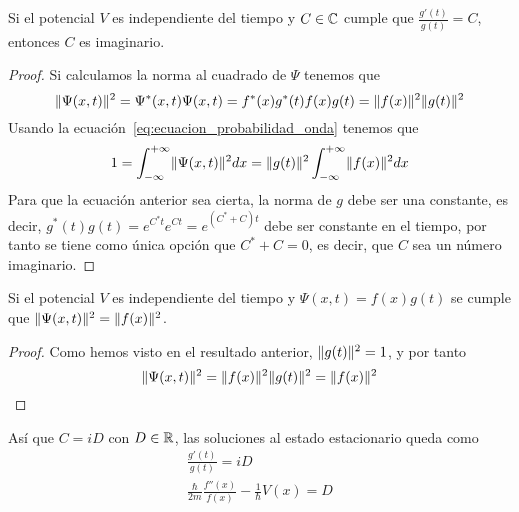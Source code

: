 \begin{resultado}
    Si el potencial $V$ es independiente del tiempo y $C\in\mathbb{C}$ cumple que $\frac{g'(t)}{g(t)}=C$, entonces $C$ es imaginario.
\end{resultado}
\begin{proof}
    Si calculamos la norma al cuadrado de $\Psi$ tenemos que
    \begin{equation*}
        \lVert\Psi(x,t)\rVert^2=\Psi^*(x,t)\Psi(x,t)=f^*(x)g^*(t)f(x)g(t)=\lVert f(x)\rVert^2\lVert g(t)\rVert^2
    \end{equation*}
    Usando la ecuación~\ref{eq:ecuacion_probabilidad_onda} tenemos que
    \begin{equation*}
        1=\int_{-\infty}^{+\infty}\lVert\Psi(x,t)\rVert^2 dx=\lVert g(t)\rVert^2\int_{-\infty}^{+\infty}\lVert f(x)\rVert^2 dx
    \end{equation*}
    Para que la ecuación anterior sea cierta, la norma de $g$ debe ser una constante, es decir, $g^*(t)g(t)=e^{C^*t}e^{Ct}=e^{(C^*+C)t}$ debe ser constante en el tiempo, por tanto se tiene como única opción que $C^*+C=0$, es decir, que $C$ sea un número imaginario.
\end{proof}

\begin{resultado}
    Si el potencial $V$ es independiente del tiempo y $\Psi(x,t)=f(x)g(t)$ se cumple que $\lVert\Psi(x,t)\rVert^2=\lVert f(x)\rVert^2$.
\end{resultado}
\begin{proof}
    Como hemos visto en el resultado anterior, $\lVert g(t)\rVert^2=1$, y por tanto
    \begin{equation}
        \label{eq:probabilidad_atemporal}
        \lVert\Psi(x,t)\rVert^2=\lVert f(x)\rVert^2\lVert g(t)\rVert^2=\lVert f(x)\rVert^2
    \end{equation}
\end{proof}
Así que $C=iD$ con $D\in\mathbb{R}$, las soluciones al estado estacionario queda como
\begin{gather*}
    \frac{g'(t)}{g(t)}=iD
    \\
    \frac{\hbar}{2m}\frac{f''(x)}{f(x)}-\frac{1}{\hbar}V(x)=D
\end{gather*}

